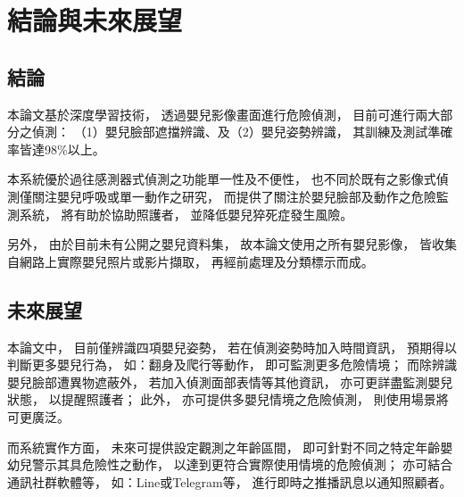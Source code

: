 \documentclass[class=NCU_thesis, crop=false]{standalone}
\begin{document}
\chapter{結論與未來展望}
\section{結論}
本論文基於深度學習技術，
透過嬰兒影像畫面進行危險偵測，
目前可進行兩大部分之偵測：
（1）嬰兒臉部遮擋辨識、及（2）嬰兒姿勢辨識，
其訓練及測試準確率皆達98\%以上。

本系統優於過往感測器式偵測之功能單一性及不便性，
也不同於既有之影像式偵測僅關注嬰兒呼吸或單一動作之研究，
而提供了關注於嬰兒臉部及動作之危險監測系統，
將有助於協助照護者，
並降低嬰兒猝死症發生風險。

另外，
由於目前未有公開之嬰兒資料集，
故本論文使用之所有嬰兒影像，
皆收集自網路上實際嬰兒照片或影片擷取，
再經前處理及分類標示而成。

\newpage

\section{未來展望}
本論文中，
目前僅辨識四項嬰兒姿勢，
若在偵測姿勢時加入時間資訊，
預期得以判斷更多嬰兒行為，
如：翻身及爬行等動作，
即可監測更多危險情境；
而除辨識嬰兒臉部遭異物遮蔽外，
若加入偵測面部表情等其他資訊，
亦可更詳盡監測嬰兒狀態，
以提醒照護者；
此外，
亦可提供多嬰兒情境之危險偵測，
則使用場景將可更廣泛。

而系統實作方面，
未來可提供設定觀測之年齡區間，
即可針對不同之特定年齡嬰幼兒警示其具危險性之動作，
以達到更符合實際使用情境的危險偵測；
亦可結合通訊社群軟體等，
如：Line或Telegram等，
進行即時之推播訊息以通知照顧者。
\end{document}
